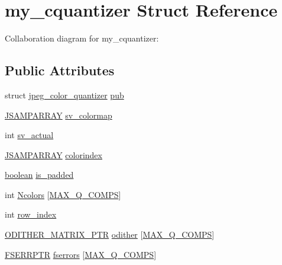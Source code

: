 \hypertarget{structmy__cquantizer}{}\section{my\+\_\+cquantizer Struct Reference}
\label{structmy__cquantizer}


Collaboration diagram for my\+\_\+cquantizer\+:
\subsection*{Public Attributes}
\begin{DoxyCompactItemize}
\item 
struct \hyperlink{structjpeg__color__quantizer}{jpeg\+\_\+color\+\_\+quantizer} \hyperlink{structmy__cquantizer_a81f2eb75e01985369a162d52f5086409}{pub}
\item 
\hyperlink{jpeglib_8h_ac9d5d1b829ed51769db69a37271a7e91}{J\+S\+A\+M\+P\+A\+R\+R\+A\+Y} \hyperlink{structmy__cquantizer_a9d0cd4d81691db3ec5f01e68fe6537bd}{sv\+\_\+colormap}
\item 
int \hyperlink{structmy__cquantizer_a9fcddbecf01942c4976e271de23effd5}{sv\+\_\+actual}
\item 
\hyperlink{jpeglib_8h_ac9d5d1b829ed51769db69a37271a7e91}{J\+S\+A\+M\+P\+A\+R\+R\+A\+Y} \hyperlink{structmy__cquantizer_a7ec499ccdb9c6983c14edc40453ac1ed}{colorindex}
\item 
\hyperlink{jmorecfg_8h_a7c6368b321bd9acd0149b030bb8275ed}{boolean} \hyperlink{structmy__cquantizer_abd8e895b22508f002cab06b54c4ee64c}{is\+\_\+padded}
\item 
int \hyperlink{structmy__cquantizer_a6b3c0905a888bd09ee2b8561ad8524c8}{Ncolors} \mbox{[}\hyperlink{jquant1_8c_aab2c575f4e3d73fa8e03c145e00459df}{M\+A\+X\+\_\+\+Q\+\_\+\+C\+O\+M\+P\+S}\mbox{]}
\item 
int \hyperlink{structmy__cquantizer_a0f10920c096845b912925a98019afc62}{row\+\_\+index}
\item 
\hyperlink{jquant1_8c_adf00bce01b4be95b97238b73f71a24ea}{O\+D\+I\+T\+H\+E\+R\+\_\+\+M\+A\+T\+R\+I\+X\+\_\+\+P\+T\+R} \hyperlink{structmy__cquantizer_aaa7e366ab4998e891762cc56f4ada754}{odither} \mbox{[}\hyperlink{jquant1_8c_aab2c575f4e3d73fa8e03c145e00459df}{M\+A\+X\+\_\+\+Q\+\_\+\+C\+O\+M\+P\+S}\mbox{]}
\item 
\hyperlink{jquant1_8c_a930ab0c20ada7242a123ab0f60de3c77}{F\+S\+E\+R\+R\+P\+T\+R} \hyperlink{structmy__cquantizer_a486b351b769e8cdfc832dc33309c7069}{fserrors} \mbox{[}\hyperlink{jquant1_8c_aab2c575f4e3d73fa8e03c145e00459df}{M\+A\+X\+\_\+\+Q\+\_\+\+C\+O\+M\+P\+S}\mbox{]}

\end{DoxyCompactItemize}
